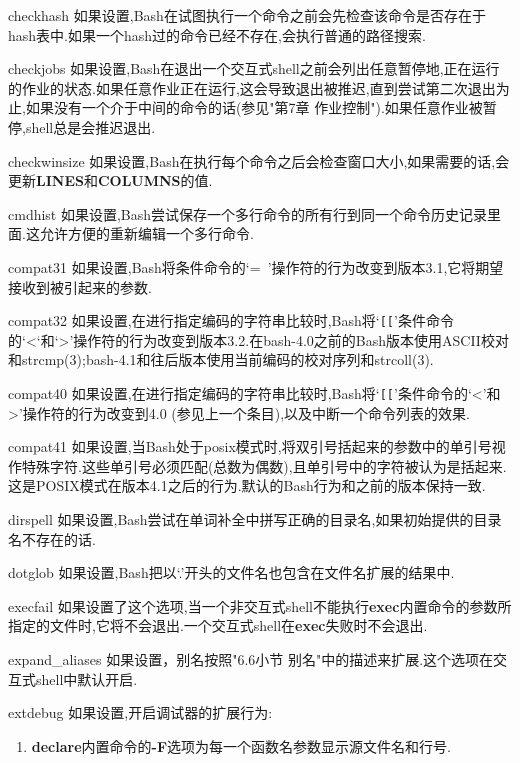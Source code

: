 \documentclass[draft,openany]{book}
\begin{document}
\begin{CJK}{UTF8}{gbsn}
\begin{basedescript}{\desclabelstyle{\nextlinelabel}\desclabelwidth{2.5em}}
    \item[checkhash] 如果设置,Bash在试图执行一个命令之前会先检查该命令是否存在于hash表中.如果一个hash过的命令已经不存在,会执行普通的路径搜索.
    \item[checkjobs] 如果设置,Bash在退出一个交互式shell之前会列出任意暂停地,正在运行的作业的状态.如果任意作业正在运行,这会导致退出被推迟,直到尝试第二次退出为止,如果没有一个介于中间的命令的话(参见"第7章 作业控制").如果任意作业被暂停,shell总是会推迟退出.
    \item[checkwinsize] 如果设置,Bash在执行每个命令之后会检查窗口大小,如果需要的话,会更新\textbf{LINES}和\textbf{COLUMNS}的值.
    \item[cmdhist] 如果设置,Bash尝试保存一个多行命令的所有行到同一个命令历史记录里面.这允许方便的重新编辑一个多行命令.
    \item[compat31] 如果设置,Bash将条件命令的`=~'操作符的行为改变到版本3.1,它将期望接收到被引起来的参数.
    \item[compat32] 如果设置,在进行指定编码的字符串比较时,Bash将`\verb+[[+'条件命令的`\textless`和`\textgreater'操作符的行为改变到版本3.2.在bash-4.0之前的Bash版本使用ASCII校对和strcmp(3);bash-4.1和往后版本使用当前编码的校对序列和strcoll(3).
    \item[compat40] 如果设置,在进行指定编码的字符串比较时,Bash将`\verb+[[+'条件命令的`\textless'和\textgreater'操作符的行为改变到4.0 (参见上一个条目),以及中断一个命令列表的效果.
    \item[compat41] 如果设置,当Bash处于posix模式时,将双引号括起来的参数中的单引号视作特殊字符.这些单引号必须匹配(总数为偶数),且单引号中的字符被认为是括起来.这是POSIX模式在版本4.1之后的行为.默认的Bash行为和之前的版本保持一致.
    \item[dirspell] 如果设置,Bash尝试在单词补全中拼写正确的目录名,如果初始提供的目录名不存在的话.
    \item[dotglob] 如果设置,Bash把以`.'开头的文件名也包含在文件名扩展的结果中.
    \item[execfail] 如果设置了这个选项,当一个非交互式shell不能执行\textbf{exec}内置命令的参数所指定的文件时,它将不会退出.一个交互式shell在\textbf{exec}失败时不会退出.
    \item[expand\_aliases] 如果设置，别名按照"6.6小节 别名"中的描述来扩展.这个选项在交互式shell中默认开启.
    \item[extdebug] 如果设置,开启调试器的扩展行为:
        \begin{enumerate}
            \item \textbf{declare}内置命令的\textbf{-F}选项为每一个函数名参数显示源文件名和行号.

\end{enumerate}
\end{basedescript}
\end{CJK}
\end{document}

